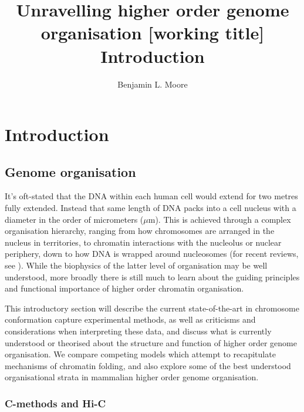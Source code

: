 \documentclass[a4paper,11pt,oneside]{book}
\title{ \vspace{3in} Unravelling higher order genome organisation {\small [working
    title]} \\ \vspace{2em} {\large {\bf Introduction}} }
\author{Benjamin L. Moore}
\begin{document}

\chapter{Introduction}
\section{Genome organisation}\label{intro:genomeorg}
%
It's oft-stated that the DNA within each human cell would extend for two metres fully extended. Instead that same length of DNA packs into a cell nucleus with a diameter in the order of micrometers ($\mu$m). This is achieved through a complex organisation hierarchy, ranging from how chromosomes are arranged in the nucleus in territories, to chromatin interactions with the nucleolus or nuclear periphery, down to how DNA is wrapped around nucleosomes (for recent reviews, see ). While the biophysics of the latter level of organisation may be well understood, more broadly there is still much to learn about the guiding principles and functional importance of higher order chromatin organisation.

This introductory section will describe the current state-of-the-art in chromosome conformation capture experimental methods, as well as criticisms and considerations when interpreting these data, and discuss what is currently understood or theorised about the structure and function of higher order genome organisation. We compare competing models which attempt to recapitulate mechanisms of chromatin folding, and also explore some of the best understood organisational strata in mammalian higher order genome organisation.

%

\subsection{C-methods and Hi-C}
\end{document}
